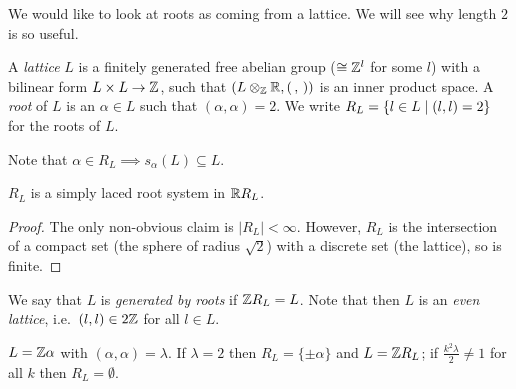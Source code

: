We would like to look at roots as coming from a lattice. We will see why
length $2$ is so useful.

\begin{definition}
A \emph{lattice} $L$ is a finitely generated free abelian group
($\cong \mathbb{Z}^l$ for some $l$) with a bilinear form $L \times L \to \mathbb{Z}$, such that
$(L \otimes_{\mathbb{Z}} \mathbb{R}, (\,,\,))$ is an inner product space. A \emph{root} of $L$ is
an $\alpha \in L$ such that $(\alpha, \alpha) = 2$. We write
$R_L = \{l \in L \mid (l, l) = 2\}$ for the roots of $L$.
\end{definition}

Note that $\alpha \in R_L \implies s_\alpha(L) \subseteq L$.

\begin{lemma}
$R_L$ is a simply laced root system in $\mathbb{R} R_L$.
\end{lemma}

\begin{proof}
The only non-obvious claim is $|R_L| < \infty$. However, $R_L$ is the
intersection of a compact set (the sphere of radius $\sqrt 2$) with a discrete
set (the lattice), so is finite.
\end{proof}

\begin{definition}
We say that $L$ is \emph{generated by roots} if $\mathbb{Z} R_L = L$. Note that then
$L$ is an \emph{even lattice}, i.e.\ $(l, l) \in 2\mathbb{Z}$ for all $l \in L$.
\end{definition}

\begin{example}
$L = \mathbb{Z}\alpha$ with $(\alpha, \alpha) = \lambda$. If $\lambda = 2$ then
$R_L = \{\pm\alpha\}$ and $L = \mathbb{Z} R_L$; if $\frac{k^2\lambda}{2} \neq 1$ for
all $k$ then $R_L = \emptyset$.
\end{example}

